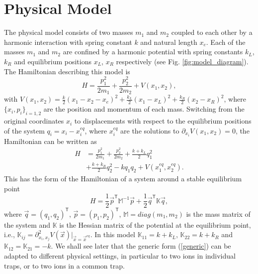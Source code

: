 \section{Physical Model \label{sec:Physical_Model}}

The physical model consists of two masses $m_1$ and $m_2$ coupled to each other by a harmonic interaction with spring constant $k$ and natural length $x_e$. Each of the masses $m_1$ and $m_2$ are confined by a harmonic potential with spring constants $k_L$, $k_R$ and equilibrium positions $x_L$, $x_R$ respectively (see Fig. \ref{fig:model_diagram}). The Hamiltonian describing this model is
%
\begin{equation}
  H = \frac{p_1^2}{2m_1} + \frac{p_2^2}{2m_2} + V(x_1,x_2),
  \label{eq:HamiltonianOriginalCordinates}
\end{equation}
%
with $V(x_1,x_2)=\frac{k}{2}\left( x_1 - x_2 - x_e \right)^2 + \frac{k_L}{2}\left( x_1 - x_L \right)^2 + \frac{k_R}{2}\left( x_2 - x_R \right)^2$,  where $\{x_i,p_i\}_{i=1,2}$ are the position and momentum of each mass. Switching from the original coordinates $x_i$ to displacements with respect to the equilibrium positions of the system $q_i = x_i - x_i^{eq}$, where $x_i^{eq}$ are the solutions to $\partial_{x_i}V(x_1,x_2)=0$, the Hamiltonian can be written as
%
\begin{align}
  H &= \frac{p_1^2}{2m_1} + \frac{p_2^2}{2m_2} + \frac{k+k_L}{2}q_1^2\nonumber\\ &+ \frac{k+k_R}{2}q_2^2 - k q_1 q_2 + V(x_1^{eq},x_2^{eq}).
  \label{eq:Hamiltonian}
\end{align}
%
This has the form of  the Hamiltonian of a system around a stable equilibrium point
%
\begin{equation}
  H = \frac{1}{2} \overrightarrow{p}^\mathsf{T}\mathbb{M}^{-1}\overrightarrow{p} + \frac{1}{2} \overrightarrow{q}^\mathsf{T}\mathbb{K}\overrightarrow{q},
\label{generic}
\end{equation}
%
where $\overrightarrow{q} = \left(q_1,q_2\right)^\mathsf{T}$, $\overrightarrow{p} = \left(p_1,p_2\right)^\mathsf{T}$, $\mathbb{M} = diag(m_1,m_2)$ is the mass matrix of the system and $\mathbb{K}$ is the Hessian matrix of the potential at the equilibrium point, i.e., $\mathbb{K}_{ij} = \partial^2_{x_i,x_j}V(\overrightarrow{x})\Big|_{\overrightarrow{x} = \overrightarrow{x}^{eq}}$. In this model  $\mathbb{K}_{11} = k + k_L$, $\mathbb{K}_{22} = k + k_R$ and $\mathbb{K}_{12} = \mathbb{K}_{21} = -k$.
We shall see later that
the generic form (\ref{generic}) can be adapted to different physical settings, in particular to
two ions in individual traps, or to two ions in a common trap.

